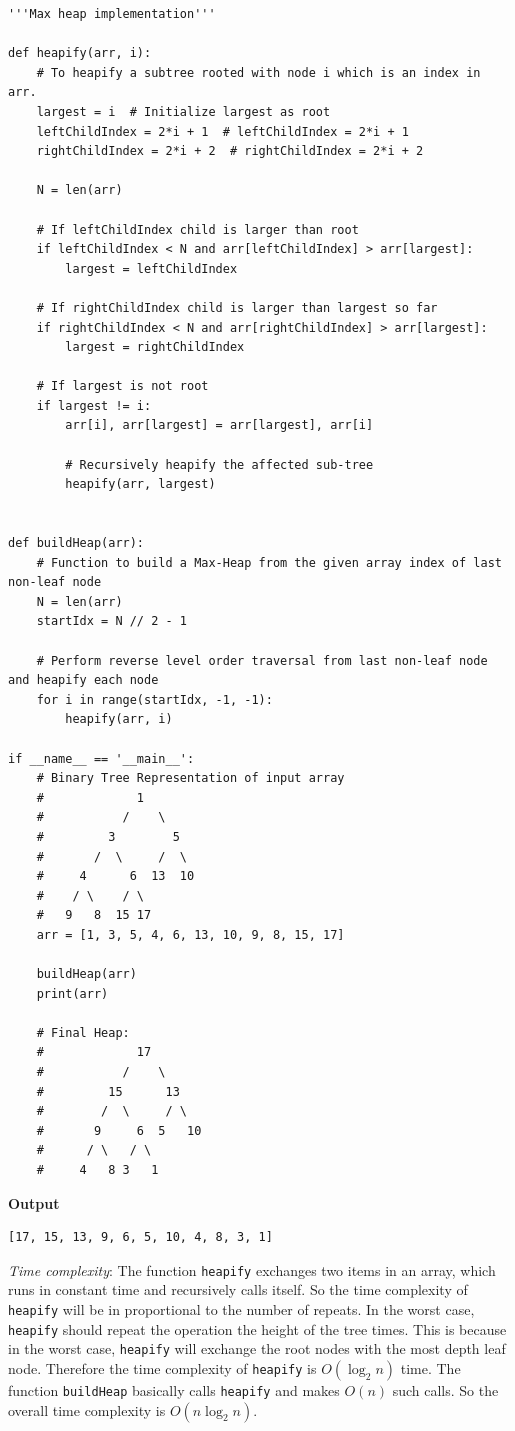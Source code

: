 \documentclass[a4paper,11pt]{book}
\begin{document}
\begin{lstlisting}
'''Max heap implementation'''

def heapify(arr, i):
    # To heapify a subtree rooted with node i which is an index in arr.
    largest = i  # Initialize largest as root
    leftChildIndex = 2*i + 1  # leftChildIndex = 2*i + 1
    rightChildIndex = 2*i + 2  # rightChildIndex = 2*i + 2

    N = len(arr)
 
    # If leftChildIndex child is larger than root
    if leftChildIndex < N and arr[leftChildIndex] > arr[largest]:
        largest = leftChildIndex
 
    # If rightChildIndex child is larger than largest so far
    if rightChildIndex < N and arr[rightChildIndex] > arr[largest]:
        largest = rightChildIndex
 
    # If largest is not root
    if largest != i:
        arr[i], arr[largest] = arr[largest], arr[i]
 
        # Recursively heapify the affected sub-tree
        heapify(arr, largest)
 

def buildHeap(arr):
    # Function to build a Max-Heap from the given array index of last non-leaf node
    N = len(arr)
    startIdx = N // 2 - 1
 
    # Perform reverse level order traversal from last non-leaf node and heapify each node
    for i in range(startIdx, -1, -1):
        heapify(arr, i)
 
if __name__ == '__main__':
    # Binary Tree Representation of input array
    #             1
    #           /    \
    #         3        5
    #       /  \     /  \
    #     4      6  13  10
    #    / \    / \
    #   9   8  15 17
    arr = [1, 3, 5, 4, 6, 13, 10, 9, 8, 15, 17]
 
    buildHeap(arr)
    print(arr)

    # Final Heap:
    #             17
    #           /    \
    #         15      13
    #        /  \     / \
    #       9     6  5   10
    #      / \   / \
    #     4   8 3   1
\end{lstlisting}
\textbf{Output}
\begin{lstlisting}
[17, 15, 13, 9, 6, 5, 10, 4, 8, 3, 1]
\end{lstlisting}

\noindent \textit{Time complexity}: The function \lstinline{heapify} exchanges two items in an array, which runs in constant time and recursively calls itself. So the time complexity of \lstinline{heapify} will be in proportional to the number of repeats. In the worst case, \lstinline{heapify} should repeat the operation the height of the tree times. This is because in the worst case, \lstinline{heapify} will exchange the root nodes with the most depth leaf node. Therefore the time complexity of \lstinline{heapify} is $O(\log_2 n)$ time. The function \lstinline{buildHeap} basically calls \lstinline{heapify} and makes $O(n)$ such calls. So the overall time complexity is $O(n\log_2 n)$.
\end{document}
